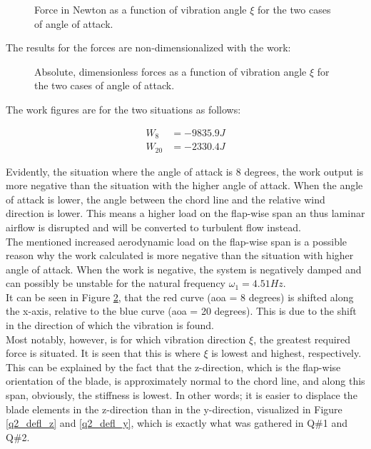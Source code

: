 \setlength\figureheight{7cm}
\setlength\figurewidth{13cm}
\begin{figure}[H]
	\hspace*{-1.8cm}
	\centering
	
	\caption{\small{Force in Newton as a function of vibration angle $\xi$ for the two cases of angle of attack.}}
	\label{q4_p1}
\end{figure}

The results for the forces are non-dimensionalized with the work:

\setlength\figureheight{7cm}
\setlength\figurewidth{13cm}
\begin{figure}[H]
	\hspace*{-1.7cm}
	\centering
	
	\caption{\small{Absolute, dimensionless forces as a function of vibration angle $\xi$ for the two cases of angle of attack.}}
	\label{q4_p2}
\end{figure}

The work figures are for the two situations as follows:

\begin{align*}
    W_8 &= -9835.9 \unit{J} \\
    W_{20} &= -2330.4 \unit{J}
\end{align*}

\newpage
Evidently, the situation where the angle of attack is 8 degrees, the work output is more negative than the situation with the higher angle of attack. When the angle of attack is lower, the angle between the chord line and the relative wind direction is lower. This means a higher load on the flap-wise span an thus laminar airflow is disrupted and will be converted to turbulent flow instead.\\
The mentioned increased aerodynamic load on the flap-wise span is a possible reason why the work calculated is more negative than the situation with higher angle of attack. When the work is negative, the system is negatively damped and can possibly be unstable for the natural frequency $\omega_1 = 4.51 \unit{Hz}$.\\

It can be seen in Figure \ref{q4_p2}, that the red curve (aoa = 8 degrees) is shifted along the x-axis, relative to the blue curve (aoa = 20 degrees). This is due to the shift in the direction of which the vibration is found. \\
Most notably, however, is for which vibration direction $\xi$, the greatest required force is situated. It is seen that this is where $\xi$ is lowest and highest, respectively. This can be explained by the fact that the z-direction, which is the flap-wise orientation of the blade, is approximately normal to the chord line, and along this span, obviously, the stiffness is lowest. In other words; it is easier to displace the blade elements in the z-direction than in the y-direction, visualized in Figure \ref{q2_defl_z} and \ref{q2_defl_y}, which is exactly what was gathered in Q\#1 and Q\#2.









